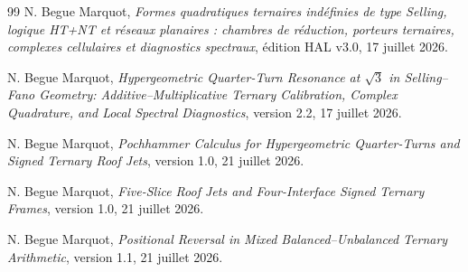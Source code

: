 \documentclass[11pt,a4paper]{article}
\begin{document}
\begin{thebibliography}{99}
N. Begue Marquot, \emph{Formes quadratiques ternaires indéfinies de type Selling, logique HT+NT et réseaux planaires : chambres de réduction, porteurs ternaires, complexes cellulaires et diagnostics spectraux}, édition HAL v3.0, 17 juillet 2026.

N. Begue Marquot, \emph{Hypergeometric Quarter-Turn Resonance at $\sqrt3$ in Selling--Fano Geometry: Additive--Multiplicative Ternary Calibration, Complex Quadrature, and Local Spectral Diagnostics}, version 2.2, 17 juillet 2026.

N. Begue Marquot, \emph{Pochhammer Calculus for Hypergeometric Quarter-Turns and Signed Ternary Roof Jets}, version 1.0, 21 juillet 2026.

N. Begue Marquot, \emph{Five-Slice Roof Jets and Four-Interface Signed Ternary Frames}, version 1.0, 21 juillet 2026.

N. Begue Marquot, \emph{Positional Reversal in Mixed Balanced--Unbalanced Ternary Arithmetic}, version 1.1, 21 juillet 2026.
\end{thebibliography}
\end{document}

